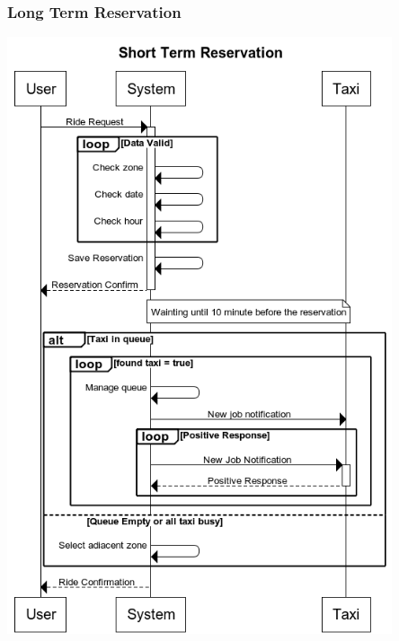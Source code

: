 	\subsubsection{Long Term Reservation}
		\begin{center}
			\includegraphics[width=0.85\textwidth]{./images/Long_Term_Reservation_Complete.png}
		\end{center}
